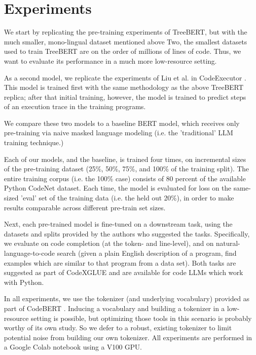 \documentclass[acmlarge]{acmart}
\begin{document}
\section{Experiments}

We start by replicating the pre-training experiments of TreeBERT, but with the much smaller, mono-lingual dataset mentioned above  Two, the smallest datasets used to train TreeBERT are on the order of millions of lines of code. Thus, we want to evaluate its performance in a much more low-resource setting.

As a second model, we replicate the experiments of Liu et al. in  CodeExecutor \cite{CodeExecutor}. This model is trained first with the same methodology as the above TreeBERT replica; after that initial training, however, the model is trained to predict steps of an execution trace in the training programs.

We compare these two models to a baseline BERT model, which receives only pre-training via naive masked language modeling (i.e. the 'traditional' LLM training technique.)

Each of our models, and the baseline, is trained four times, on incremental sizes of the pre-training dataset (25\%, 50\%, 75\%, and 100\% of the training split). The entire training corpus (i.e. the 100\% case) consists of 80 percent of the available Python CodeNet dataset. Each time, the model is evaluated for loss on the same-sized 'eval' set of the training data (i.e. the held out 20\%), in order to make results comparable across different pre-train set sizes.

Next, each pre-trained model is fine-tuned on a downstream task, using the datasets and splits provided by the authors who suggested the tasks. Specifically, we evaluate on code completion (at the token- and line-level), and on natural-language-to-code search (given a plain English description of a program, find examples which are similar to that program from a data set). Both tasks are suggested as part of CodeXGLUE \cite{CodeXGlUE} and are available for code LLMs which work with Python.

In all experiments, we use the tokenizer (and underlying vocabulary) provided as part of CodeBERT \cite{feng2020codebert}. Inducing a vocabulary and building a tokenizer in a low-resource setting is possible, but optimizing those tools in this scenario is probably worthy of its own study. So we defer to a robust, existing tokenizer to limit potential noise from building our own tokenizer. All experiments are performed in a Google Colab notebook using a V100 GPU.
\end{document}
